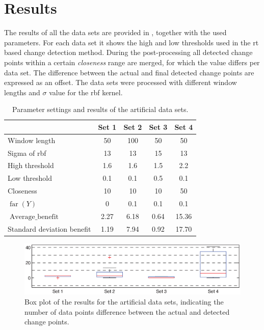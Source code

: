 \section{Results}\label{sec:artificial_data_results}
The results of all the data sets are provided in , together with the used parameters.
For each data set it shows the high and low thresholds used in the \gls{rt} based change detection method.
During the post-processing all detected change points within a certain \emph{closeness} range are merged, for which the value differs per data set.
The difference between the actual and final detected change points are expressed as an offset.
The data sets were processed with different window lengths and $\sigma$ value for the \gls{rbf} kernel.

\begin{table}
  \centering
  \begin{tabulary}{\textwidth}{|l|c|c|c|c|}
     & Set 1 & Set 2 & Set 3 & Set 4 \\
    \hline
    Window length & 50 & 100 & 50 & 50 \\
    \hline
    Sigma of \gls{rbf} & 13 & 13 & 15 & 13 \\
    \hline
    High threshold & 1.6 & 1.6 & 1.5 & 2.2 \\
    \hline
    Low threshold & 0.1 & 0.1 & 0.5 & 0.1 \\
    \hline
    Closeness & 10 & 10 & 10 & 50 \\
    \hline
    \hline
    $\operatorname*{far}(Y)$ & 0 & 0.1 & 0.1 & 0.1 \\
    \hline
    $\operatorname*{Average\_benefit}$ & 2.27 & 6.18 & 0.64 & 15.36 \\
    \hline
    Standard deviation benefit & 1.19 & 7.94 & 0.92 & 17.70 \\
    \hline
  \end{tabulary}
  \caption[Results artificial data sets]{Parameter settings and results of the artificial data sets.}
  \label{tab:results_artificial}
\end{table}

\begin{figure}
\centering
  \includegraphics[width=1\textwidth]{./Figures/chapter5/boxplot_results_artificial_sets.eps}
  \caption[Box plot results artificial data sets]{Box plot of the results for the artificial data sets, indicating the number of data points difference between the actual and detected change points.}
  \label{fig:boxplot_artificial_sets}
\end{figure}

